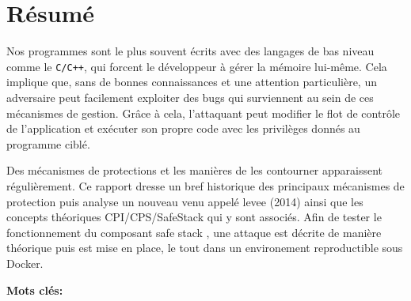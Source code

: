 
%
%


\chapter*{Résumé}

Nos programmes sont le plus souvent écrits avec des langages de bas niveau comme le \texttt{C/C++}, qui forcent le développeur à gérer la mémoire lui-même. Cela implique que, sans de bonnes connaissances et une attention particulière, un adversaire peut facilement exploiter des bugs qui surviennent au sein de ces mécanismes de gestion. Grâce à cela, l’attaquant peut modifier le flot de contrôle de l'application et exécuter son propre code avec les privilèges donnés au programme ciblé.

Des mécanismes de protections et les manières de les contourner apparaissent régulièrement. Ce rapport dresse un bref historique des principaux mécanismes de protection puis analyse un nouveau venu appelé \gls{levee} (2014) ainsi que les concepts théoriques CPI/CPS/SafeStack qui y sont associés. Afin de tester le fonctionnement du composant \og safe stack \fg, une attaque est décrite de manière théorique puis est mise en place, le tout dans un environement reproductible sous Docker.

\vskip0.5cm
\noindent\textbf{Mots clés:}
\Keywordsfr
